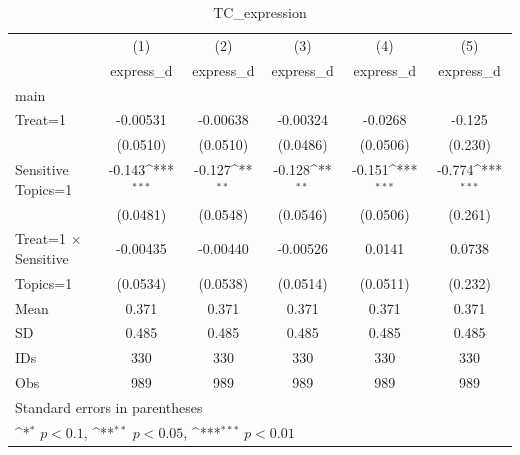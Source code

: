\begin{table}[htbp]\centering
\def\sym#1{\ifmmode^{#1}\else\(^{#1}\)\fi}
\caption{TC\_expression}
\begin{tabular}{l*{5}{c}}
\hline\hline
                                &\multicolumn{1}{c}{(1)}&\multicolumn{1}{c}{(2)}&\multicolumn{1}{c}{(3)}&\multicolumn{1}{c}{(4)}&\multicolumn{1}{c}{(5)}\\
                                &\multicolumn{1}{c}{express\_d}&\multicolumn{1}{c}{express\_d}&\multicolumn{1}{c}{express\_d}&\multicolumn{1}{c}{express\_d}&\multicolumn{1}{c}{express\_d}\\
\hline
main                            &                  &                  &                  &                  &                  \\
Treat=1                         & -0.00531         & -0.00638         & -0.00324         &  -0.0268         &   -0.125         \\
                                & (0.0510)         & (0.0510)         & (0.0486)         & (0.0506)         &  (0.230)         \\
Sensitive Topics=1              &   -0.143\sym{***}&   -0.127\sym{**} &   -0.128\sym{**} &   -0.151\sym{***}&   -0.774\sym{***}\\
                                & (0.0481)         & (0.0548)         & (0.0546)         & (0.0506)         &  (0.261)         \\
Treat=1 $\times$ Sensitive      & -0.00435         & -0.00440         & -0.00526         &   0.0141         &   0.0738         \\
Topics=1                        & (0.0534)         & (0.0538)         & (0.0514)         & (0.0511)         &  (0.232)         \\
\hline
Mean                            &    0.371         &    0.371         &    0.371         &    0.371         &    0.371         \\
SD                              &    0.485         &    0.485         &    0.485         &    0.485         &    0.485         \\
IDs                             &      330         &      330         &      330         &      330         &      330         \\
Obs                             &      989         &      989         &      989         &      989         &      989         \\
\hline\hline
\multicolumn{6}{l}{\footnotesize Standard errors in parentheses}\\
\multicolumn{6}{l}{\footnotesize \sym{*} \(p<0.1\), \sym{**} \(p<0.05\), \sym{***} \(p<0.01\)}\\
\end{tabular}
\end{table}
